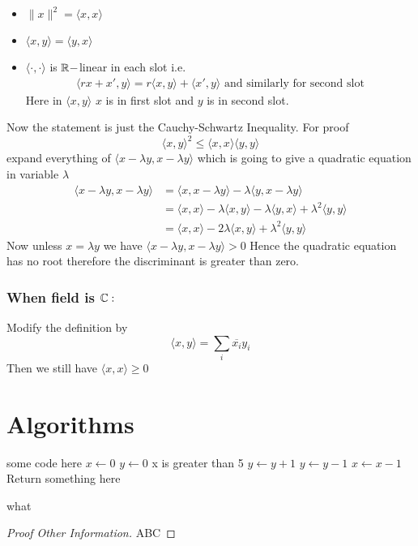 \documentclass{report}
\begin{document}
{	\begin{note}
		\begin{itemize}
			\item $\|x\|^2=\langle x,x\rangle$
			\item $\langle x,y\rangle=\langle y,x\rangle$
			\item $\langle \cdot,\cdot\rangle$ is $\mathbb{R}-$linear in each slot i.e. \begin{align*}
				      \langle rx+x',y\rangle=r\langle x,y\rangle+\langle x',y\rangle	\text{ and similarly for second slot}
			      \end{align*}Here in $\langle x,y\rangle$ $x$ is in first slot and $y$ is in second slot.
		\end{itemize}
	\end{note}Now the statement is just the Cauchy-Schwartz Inequality. For proof $$\langle x,y\rangle^2\leq \langle x,x\rangle\langle y,y\rangle $$ expand everything of $\langle x-\lambda y,x-\lambda y\rangle$ which is going to give a quadratic equation in variable $\lambda $ \begin{align*}
		\langle x-\lambda y,x-\lambda y\rangle & =\langle x,x-\lambda y\rangle-\lambda\langle y,x-\lambda y\rangle                                       \\
		                                       & =\langle x ,x\rangle -\lambda\langle x,y\rangle -\lambda\langle y,x\rangle +\lambda^2\langle y,y\rangle \\
		                                       & =\langle x,x\rangle -2\lambda\langle x,y\rangle+\lambda^2\langle y,y\rangle
	\end{align*}Now unless $x=\lambda y$ we have $\langle x-\lambda y,x-\lambda y\rangle>0$ Hence the quadratic equation has no root therefore the discriminant is greater than zero.

	\subsubsection*{\textbf{When field is $\mathbb{C}:$}}Modify the definition by $$\langle x,y\rangle=\sum_i\overline{x_i}y_i$$Then we still have $\langle x,x\rangle\geq 0$}

\section{Algorithms}
\begin{algorithm}[H]
\SetAlgoLined
\SetNoFillComment
{}
\vspace{3mm}
some code here\;
$x \leftarrow 0$\;
$y \leftarrow 0$\;
 {
    x is greater than 5 
}
 {
    $y \leftarrow y + 1$\;
}
 {
    $y \leftarrow y - 1$\;
}
 {
    $x \leftarrow x - 1$\;
}
\Return Return something here\;
\caption{what}
\end{algorithm}

\begin{proof}[Proof Other Information]
  ABC
\end{proof}
\end{document}
